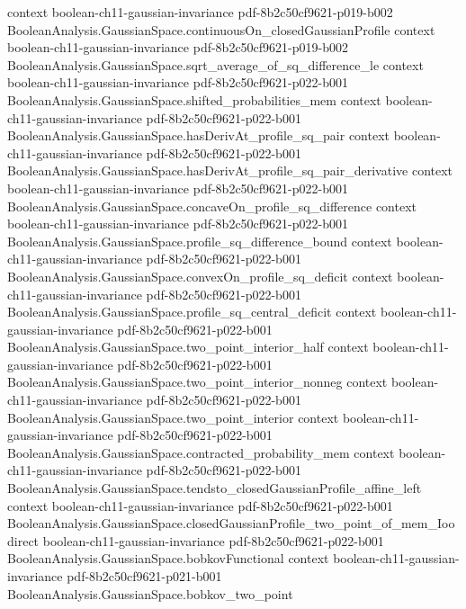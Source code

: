 \begin{theorem}
  {context}
  {boolean-ch11-gaussian-invariance}
  {pdf-8b2c50cf9621-p019-b002}
\proofstep
  {BooleanAnalysis.GaussianSpace.continuousOn_closedGaussianProfile}
  {context}
  {boolean-ch11-gaussian-invariance}
  {pdf-8b2c50cf9621-p019-b002}
\proofstep
  {BooleanAnalysis.GaussianSpace.sqrt_average_of_sq_difference_le}
  {context}
  {boolean-ch11-gaussian-invariance}
  {pdf-8b2c50cf9621-p022-b001}
\proofstep
  {BooleanAnalysis.GaussianSpace.shifted_probabilities_mem}
  {context}
  {boolean-ch11-gaussian-invariance}
  {pdf-8b2c50cf9621-p022-b001}
\proofstep
  {BooleanAnalysis.GaussianSpace.hasDerivAt_profile_sq_pair}
  {context}
  {boolean-ch11-gaussian-invariance}
  {pdf-8b2c50cf9621-p022-b001}
\proofstep
  {BooleanAnalysis.GaussianSpace.hasDerivAt_profile_sq_pair_derivative}
  {context}
  {boolean-ch11-gaussian-invariance}
  {pdf-8b2c50cf9621-p022-b001}
\proofstep
  {BooleanAnalysis.GaussianSpace.concaveOn_profile_sq_difference}
  {context}
  {boolean-ch11-gaussian-invariance}
  {pdf-8b2c50cf9621-p022-b001}
\proofstep
  {BooleanAnalysis.GaussianSpace.profile_sq_difference_bound}
  {context}
  {boolean-ch11-gaussian-invariance}
  {pdf-8b2c50cf9621-p022-b001}
\proofstep
  {BooleanAnalysis.GaussianSpace.convexOn_profile_sq_deficit}
  {context}
  {boolean-ch11-gaussian-invariance}
  {pdf-8b2c50cf9621-p022-b001}
\proofstep
  {BooleanAnalysis.GaussianSpace.profile_sq_central_deficit}
  {context}
  {boolean-ch11-gaussian-invariance}
  {pdf-8b2c50cf9621-p022-b001}
\proofstep
  {BooleanAnalysis.GaussianSpace.two_point_interior_half}
  {context}
  {boolean-ch11-gaussian-invariance}
  {pdf-8b2c50cf9621-p022-b001}
\proofstep
  {BooleanAnalysis.GaussianSpace.two_point_interior_nonneg}
  {context}
  {boolean-ch11-gaussian-invariance}
  {pdf-8b2c50cf9621-p022-b001}
\proofstep
  {BooleanAnalysis.GaussianSpace.two_point_interior}
  {context}
  {boolean-ch11-gaussian-invariance}
  {pdf-8b2c50cf9621-p022-b001}
\proofstep
  {BooleanAnalysis.GaussianSpace.contracted_probability_mem}
  {context}
  {boolean-ch11-gaussian-invariance}
  {pdf-8b2c50cf9621-p022-b001}
\proofstep
  {BooleanAnalysis.GaussianSpace.tendsto_closedGaussianProfile_affine_left}
  {context}
  {boolean-ch11-gaussian-invariance}
  {pdf-8b2c50cf9621-p022-b001}
\proofstep
  {BooleanAnalysis.GaussianSpace.closedGaussianProfile_two_point_of_mem_Ioo}
  {direct}
  {boolean-ch11-gaussian-invariance}
  {pdf-8b2c50cf9621-p022-b001}
\proofstep
  {BooleanAnalysis.GaussianSpace.bobkovFunctional}
  {context}
  {boolean-ch11-gaussian-invariance}
  {pdf-8b2c50cf9621-p021-b001}
\proofstep
  {BooleanAnalysis.GaussianSpace.bobkov_two_point}

\end{theorem}
